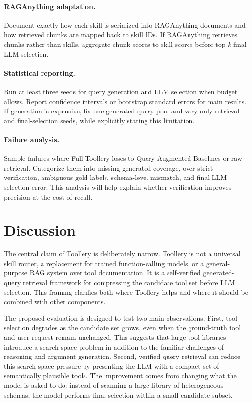 \documentclass[11pt]{article}
\begin{document}
\paragraph{RAGAnything adaptation.}
Document exactly how each skill is serialized into RAGAnything documents and how
retrieved chunks are mapped back to skill IDs. If RAGAnything retrieves chunks
rather than skills, aggregate chunk scores to skill scores before top-$k$ final
LLM selection.

\paragraph{Statistical reporting.}
Run at least three seeds for query generation and LLM selection when budget
allows. Report confidence intervals or bootstrap standard errors for main
results. If generation is expensive, fix one generated query pool and vary only
retrieval and final-selection seeds, while explicitly stating this limitation.

\paragraph{Failure analysis.}
Sample failures where Full Toollery loses to Query-Augmented Baselines or raw
retrieval. Categorize them into missing generated coverage, over-strict
verification, ambiguous gold labels, schema-level mismatch, and final LLM
selection error. This analysis will help explain whether verification improves
precision at the cost of recall.
\section{Discussion}
\label{sec:discussion_draft}

The central claim of Toollery is deliberately narrow. Toollery is not a universal skill router, a replacement for trained function-calling models, or a general-purpose RAG system over tool documentation. It is a self-verified generated-query retrieval framework for compressing the candidate tool set before LLM selection. This framing clarifies both where Toollery helps and where it should be combined with other components.

The proposed evaluation is designed to test two main observations. First, tool selection degrades as the candidate set grows, even when the ground-truth tool and user request remain unchanged. This suggests that large tool libraries introduce a search-space problem in addition to the familiar challenges of reasoning and argument generation. Second, verified query retrieval can reduce this search-space pressure by presenting the LLM with a compact set of semantically plausible tools. The improvement comes from changing what the model is asked to do: instead of scanning a large library of heterogeneous schemas, the model performs final selection within a small candidate subset.
\end{document}
